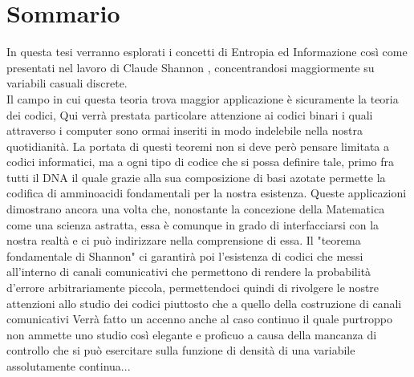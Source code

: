 \chapter*{Sommario} %
\label{sommario}

In questa tesi verranno esplorati i concetti di Entropia ed Informazione così come presentati nel lavoro di Claude Shannon \cite{Shannon}, concentrandosi maggiormente su variabili casuali discrete.\\
Il campo in cui questa teoria trova maggior applicazione è sicuramente la teoria dei codici, Qui verrà prestata particolare attenzione ai codici binari i quali attraverso i computer sono ormai inseriti in modo indelebile nella nostra quotidianità. La portata di questi teoremi non si deve però pensare limitata a codici informatici, ma a ogni tipo di codice che si possa definire tale, primo fra tutti il DNA il quale grazie alla sua composizione di basi azotate permette la codifica di amminoacidi fondamentali per la nostra esistenza. Queste applicazioni dimostrano ancora una volta che, nonostante la concezione della Matematica come una scienza astratta, essa è comunque in grado di interfacciarsi con la nostra realtà e ci può indirizzare nella comprensione di essa.
Il "teorema fondamentale di Shannon" ci garantirà poi l'esistenza di codici che messi all'interno di canali comunicativi che permettono di rendere la probabilità d'errore arbitrariamente piccola, permettendoci quindi di rivolgere le nostre attenzioni allo studio dei codici piuttosto che a quello della costruzione di canali comunicativi
Verrà fatto un accenno anche al caso continuo il quale purtroppo non ammette uno studio così elegante e proficuo a causa della mancanza di controllo che si può esercitare sulla funzione di densità di una variabile assolutamente continua...





